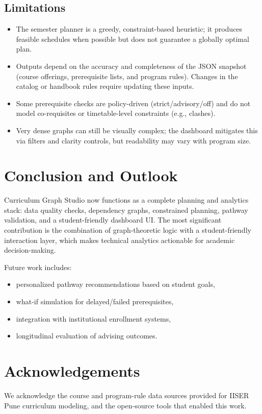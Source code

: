 \subsection{Limitations}
\begin{itemize}
    \item The semester planner is a greedy, constraint-based heuristic; it
    produces feasible schedules when possible but does not guarantee a globally
    optimal plan.
    \item Outputs depend on the accuracy and completeness of the JSON snapshot
    (course offerings, prerequisite lists, and program rules). Changes in the
    catalog or handbook rules require updating these inputs.
    \item Some prerequisite checks are policy-driven (strict/advisory/off) and
    do not model co-requisites or timetable-level constraints (e.g., clashes).
    \item Very dense graphs can still be visually complex; the dashboard
    mitigates this via filters and clarity controls, but readability may vary
    with program size.
\end{itemize}

\section{Conclusion and Outlook}
Curriculum Graph Studio now functions as a complete planning and analytics
stack: data quality checks, dependency graphs, constrained planning, pathway
validation, and a student-friendly dashboard UI. The most significant contribution is the
combination of graph-theoretic logic with a student-friendly interaction layer,
which makes technical analytics actionable for academic decision-making.

Future work includes:

\begin{itemize}
    \item personalized pathway recommendations based on student goals,
    \item what-if simulation for delayed/failed prerequisites,
    \item integration with institutional enrollment systems,
    \item longitudinal evaluation of advising outcomes.
\end{itemize}

\section{Acknowledgements}
We acknowledge the course and program-rule data sources provided for IISER Pune
curriculum modeling, and the open-source tools that enabled this work.

